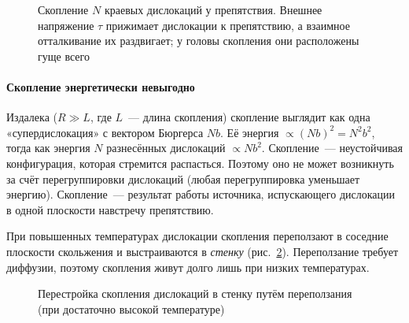 \begin{figure}[ht]
\centering
{}
\caption{Скопление $N$ краевых дислокаций у препятствия. Внешнее
напряжение $\tau$ прижимает дислокации к препятствию, а взаимное
отталкивание их раздвигает; у головы скопления они расположены гуще всего}
\label{fig:pileup}
\end{figure}

\paragraph{Скопление энергетически невыгодно}
Издалека ($R\gg L$, где $L$~— длина скопления) скопление выглядит как
одна «супердислокация» с вектором Бюргерса $Nb$. Её энергия
$\propto(Nb)^2=N^2b^2$, тогда как энергия $N$ разнесённых дислокаций
$\propto Nb^2$. Скопление~— неустойчивая конфигурация, которая стремится
распасться. Поэтому оно не может возникнуть за счёт перегруппировки
дислокаций (любая перегруппировка уменьшает энергию). Скопление~—
результат работы источника, испускающего дислокации в одной плоскости
навстречу препятствию.

При повышенных температурах дислокации скопления переползают в
соседние плоскости скольжения и выстраиваются в \emph{стенку}
(рис.~\ref{fig:pileup-to-wall}). Переползание требует диффузии, поэтому
скопления живут долго лишь при низких температурах.

\begin{figure}[ht]
\centering
{}
\caption{Перестройка скопления дислокаций в стенку путём переползания
(при достаточно высокой температуре)}
\label{fig:pileup-to-wall}
\end{figure}

